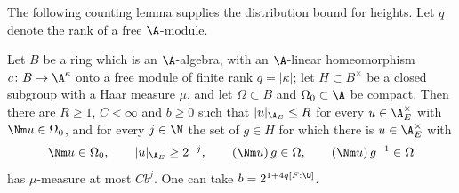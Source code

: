 The following counting lemma supplies the distribution bound for heights. Let $q$ denote the rank of a free
$\A$-module.

\begin{lemma}[Counting]\label{pf:tlift:countad}
Let $B$ be a ring which is an $\A$-algebra, with an $\A$-linear homeomorphism $c\colon B\to\A^\kappa$ onto a free module of finite rank
$q=|\kappa|$; let $H\subset B^\times$ be a closed subgroup with a Haar measure $\mu$, and let $\Omega\subset B$ and $\Omega_0\subset\A$ be compact.
Then there are $R\ge1$, $C<\infty$ and $b\ge0$ such that $|u|_{\tliftAE}\le R$ for every $u\in\tliftAE^\times$ with $\Nm u\in\Omega_0$, and for
every $j\in\N$ the set of $g\in H$ for which there is $u\in\tliftAE^\times$ with
\[
  \Nm u\in\Omega_0,\qquad|u|_{\tliftAE}\ge2^{-j},\qquad(\Nm u)\,g\in\Omega,\qquad(\Nm u)\,g^{-1}\in\Omega
\]
has $\mu$-measure at most $Cb^j$. One can take $b=2^{1+4q[F:\Q]}$.
\end{lemma}

